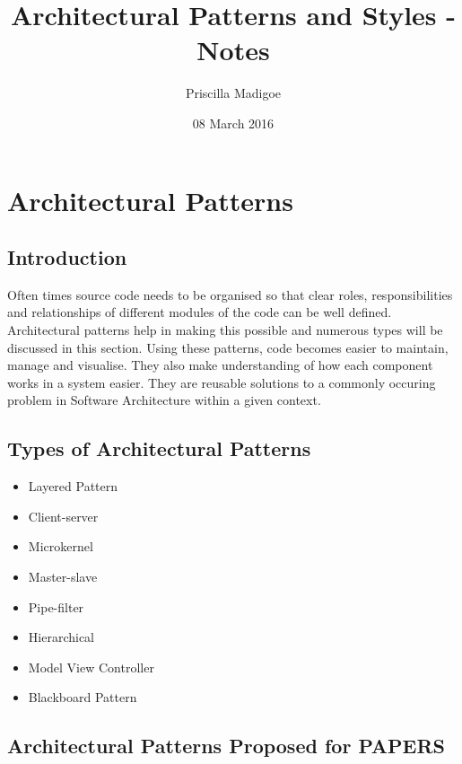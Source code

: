 \documentclass[a4paper,12pt]{article}
\begin{document}
\title{Architectural Patterns and Styles - Notes}
\author{Priscilla Madigoe}
\date{08 March 2016}
\maketitle
 
\section{Architectural Patterns}

\subsection{Introduction}
Often times source code needs to be organised so that clear roles, responsibilities and relationships of different modules of the code can be well defined. Architectural patterns help in making this possible and numerous types will be discussed in this section. Using these patterns, code becomes easier to maintain, manage and visualise. They also make understanding of how each component works in a system easier. They are reusable solutions to a commonly occuring problem in Software Architecture within a given context.

\subsection{Types of Architectural Patterns}

\begin{itemize}
\item Layered Pattern
\item Client-server
\item Microkernel
\item Master-slave
\item Pipe-filter
\item Hierarchical
\item Model View Controller
\item Blackboard Pattern
\end{itemize}

\subsection{Architectural Patterns Proposed for PAPERS}
\end{document}
